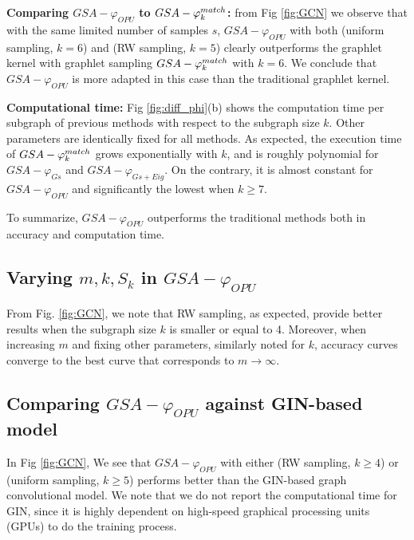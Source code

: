 \documentclass{article}
\begin{document}
\noindent\textbf{Comparing $GSA-\varphi_{OPU}$ to $GSA-\varphi^{match}_k$:} from Fig \ref{fig:GCN} we observe that  with the same limited number of samples $s$, $GSA-\varphi_{OPU}$ with both (uniform sampling, $k=6$) and (RW sampling, $k=5$)  clearly outperforms the graphlet kernel with graphlet sampling $GSA-\varphi^{match}_k$ with $k=6$.  We conclude that $GSA-\varphi_{OPU}$ is more adapted in this case than the traditional graphlet kernel. 

\noindent\textbf{Computational time:} Fig \ref{fig:diff_phi}(b) shows the computation time per subgraph of  previous methods with respect to the subgraph size $k$. Other parameters are identically fixed for all methods. As expected, the execution time of $GSA-\varphi^{match}_k$ grows exponentially with  $k$, and is roughly polynomial for $GSA-\varphi_{Gs}$ and $GSA-\varphi_{Gs+Eig}$. On the contrary, it is almost constant for $GSA-\varphi_{OPU}$ and significantly the lowest when $k\geq7$. 

To summarize, $GSA-\varphi_{OPU}$ outperforms the traditional methods both in accuracy and computation time.

\subsection{Varying $m, k, S_k$ in $GSA-{\varphi_{OPU}}$}
From Fig. \ref{fig:GCN}, we note  that  RW sampling, as expected, provide better results when the subgraph size $k$  is smaller or equal to 4. Moreover, when increasing $m$ and fixing other parameters, similarly noted for $k$, accuracy curves converge to the best curve that corresponds to $m\rightarrow\infty$.

\subsection{Comparing $GSA-\varphi_{OPU}$ against GIN-based model}\label{sec:vs_GIN}

In Fig \ref{fig:GCN}, We see that $GSA-\varphi_{OPU}$ with either (RW sampling, $k\geq4$) or (uniform sampling, $k\geq5$) performs better than the GIN-based graph convolutional model. We note that we do not report the computational time for GIN, since it is highly dependent on high-speed graphical processing units (GPUs) to do the training process.
\end{document}
